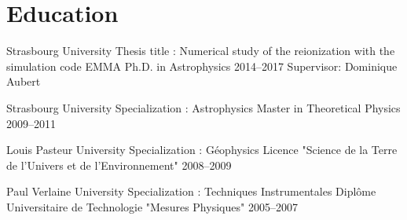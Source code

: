 \documentclass[11pt,a4paper,sans]{moderncv}
\begin{document}


\section{Education}

\cventry
{Strasbourg University}
{Thesis title : Numerical study of the reionization with the simulation code EMMA}
{Ph.D. in Astrophysics}
{2014--2017}
{}
{Supervisor: Dominique Aubert}


\cventry
{Strasbourg University}
{Specialization : Astrophysics}
{Master in Theoretical Physics}
{2009--2011}
{}
{}

\cventry
{Louis Pasteur University}
{Specialization : Géophysics}
{Licence "Science de la Terre de l'Univers et de l’Environnement"}
{2008--2009}
{}
{}


\cventry
{Paul Verlaine University}
{Specialization : Techniques Instrumentales}
{Diplôme Universitaire de Technologie "Mesures Physiques"}
{2005--2007}
{}
{}









\end{document}
